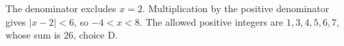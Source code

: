 The denominator excludes $x=2$. Multiplication by the positive denominator gives $|x-2|<6$, so $-4<x<8$. The allowed positive integers are $1,3,4,5,6,7$, whose sum is $\boxed{26}$, choice D.
